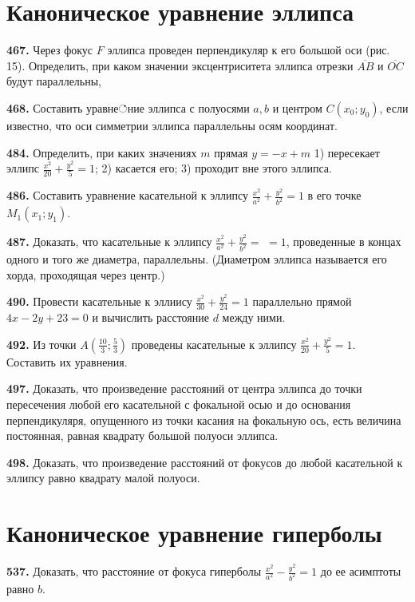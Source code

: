 \section{Каноническое уравнение эллипса}



\textbf{467.} Через фокус $F$ эллипса проведен перпендикуляр к его большой оси (рис. 15). Определить, при каком значении эксцентриситета эллипса отрезки $\overline{A B}$ и $\overline{O C}$ будут параллельны,

\textbf{468.} Составить уравне்ние эллипса с полуосями $a, b$ и центром $C\left(x_0 ; y_0\right)$, если известно, что оси симметрии эллипса параллельны осям координат.

\textbf{484.} Определить, при каких значениях $m$ прямая $y=-x+m$ 1) пересекает эллипс $\frac{x^2}{20}+\frac{y^2}{5}=1$; 2) касается его; 3) проходит вне этого эллипса.

\textbf{486.} Составить уравнение касательной к эллипсу $\frac{x^2}{a^2}+\frac{y^2}{b^2}=1$ в его точке $M_1\left(x_1 ; y_1\right)$.

\textbf{487.} Доказать, что касательные к эллипсу $\frac{x^2}{a^2}+\frac{y^2}{b^2}=$ $=1$, проведенные в концах одного и того же диаметра, параллельны. (Диаметром эллипса называется его хорда, проходящая через центр.)

\textbf{490.} Провести касательные к эллиису $\frac{x^2}{30}+\frac{y^2}{24}=1$ параллельно прямой $4 x-2 y+23=0$ и вычислить расстояние $d$ между ними.

\textbf{492.} Из точки $A\left(\frac{10}{3} ; \frac{5}{3}\right)$ проведены касательные к эллипсу $\frac{x^2}{20}+\frac{y^2}{5}=1$. Составить их уравнения.

\textbf{497.} Доказать, что произведение расстояний от центра эллипса до точки пересечения любой его касательной с фокальной осью и до основания перпендикуляря, опущенного из точки касания на фокальную ось, есть величина постоянная, равная квадрату большой полуоси эллипса.

\textbf{498.} Доказать, что произведение расстояний от фокусов до любой касательной к эллипсу равно квадрату малой полуоси.



\section{Каноническое уравнение гиперболы}



\textbf{537.} Доказать, что расстояние от фокуса гиперболы $\frac{x^2}{a^2}-\frac{y^2}{b^2}=1$ до ее асимптоты равно $b$.

